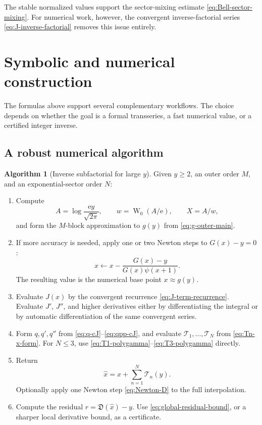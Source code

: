 \documentclass[11pt,oneside]{article}
\theoremstyle{plain}
\theoremstyle{definition}
\newtheorem{algorithm}[theorem]{Algorithm}
\theoremstyle{remark}
\newcommand{\ee}{\mathrm{e}}
\newcommand{\W}{\operatorname{W}}
\newcommand{\Dfrak}{\mathfrak{D}}
\newcommand{\Tcal}{\mathcal{T}}
\begin{document}
The stable normalized values support the sector-mixing estimate
\eqref{eq:Bell-sector-mixing}.  For numerical work, however, the convergent
inverse-factorial series \eqref{eq:J-inverse-factorial} removes this issue
entirely.

\section{Symbolic and numerical construction}
\label{sec:algorithms}

The formulas above support several complementary workflows.  The choice
depends on whether the goal is a formal transseries, a fast numerical value, or
a certified integer inverse.

\subsection{A robust numerical algorithm}

\begin{algorithm}[Inverse subfactorial for large \(y\)]
\label{alg:numerical-inverse}
Given \(y\ge2\), an outer order \(M\), and an exponential-sector order
\(N\):
\begin{enumerate}
\item Compute
\[
 A=\log\!\frac{\ee y}{\sqrt{2\pi}},\qquad
 w=\W_0(A/\ee),\qquad X=A/w,
\]
and form the \(M\)-block approximation to \(g(y)\) from
\eqref{eq:g-outer-main}.
\item If more accuracy is needed, apply one or two Newton steps to
\(G(x)-y=0\):
\[
 x\leftarrow x-\frac{G(x)-y}{G(x)\psi(x+1)}.
\]
The resulting value is the numerical base point \(x\approx g(y)\).
\item Evaluate \(J(x)\) by the convergent recurrence
\eqref{eq:J-term-recurrence}.  Evaluate \(J'\), \(J''\), and higher
derivatives either by differentiating the integral or by automatic
differentiation of the same convergent series.
\item Form \(q,q',q''\) from \eqref{eq:q-cJ}--\eqref{eq:qpp-cJ}, and evaluate
\(\Tcal_1,\ldots,\Tcal_N\) from \eqref{eq:Tn-x-form}.  For \(N\le3\), use
\eqref{eq:T1-polygamma}--\eqref{eq:T3-polygamma} directly.
\item Return
\[
 \widehat{x}=x+\sum_{n=1}^{N}\Tcal_n(y).
\]
Optionally apply one Newton step \eqref{eq:Newton-D} to the full interpolation.
\item Compute the residual \(r=\Dfrak(\widehat{x})-y\).  Use
\eqref{eq:global-residual-bound}, or a sharper local derivative bound, as a
certificate.
\end{enumerate}
\end{algorithm}
\end{document}
